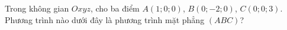 \begin{ex}
Trong không gian $Oxyz$, cho ba điểm $A(1;0;0)$, $B(0;-2;0)$, $C(0;0;3)$. Phương trình nào dưới đây là phương trình mặt phẳng $(ABC)$?
\end{ex}
